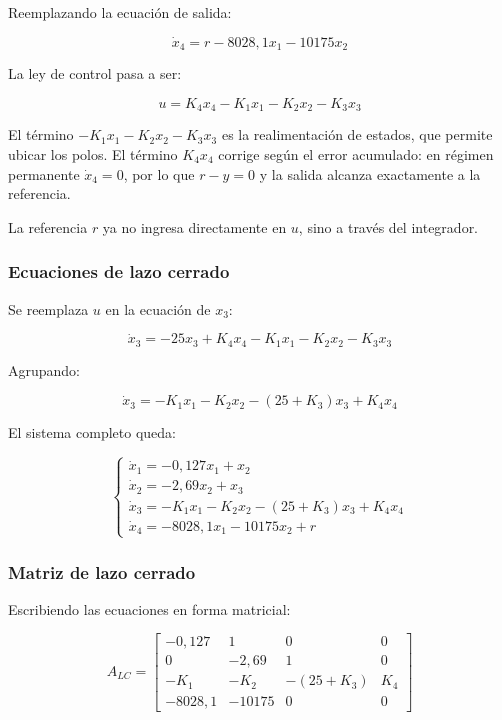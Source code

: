 \documentclass[12pt,a4paper]{article}
\begin{document}
Reemplazando la ecuación de salida:

\begin{equation}\boxed{\dot{x}_4=r-8028{,}1x_1-10175x_2}\end{equation}

La ley de control pasa a ser:

\begin{equation}\boxed{u=K_4x_4-K_1x_1-K_2x_2-K_3x_3}\end{equation}

El término $-K_1x_1-K_2x_2-K_3x_3$ es la realimentación de estados, que permite ubicar los polos. El término $K_4x_4$ corrige según el error acumulado: en régimen permanente $\dot{x}_4=0$, por lo que $r-y=0$ y la salida alcanza exactamente a la referencia.

La referencia $r$ ya no ingresa directamente en $u$, sino a través del integrador.
\subsubsection*{Ecuaciones de lazo cerrado}
Se reemplaza $u$ en la ecuación de $x_3$:

\begin{equation}\dot{x}_3=-25x_3+K_4x_4-K_1x_1-K_2x_2-K_3x_3\end{equation}

Agrupando:

\begin{equation}\dot{x}_3=-K_1x_1-K_2x_2-(25+K_3)x_3+K_4x_4\end{equation}

El sistema completo queda:

\begin{equation}\boxed{\begin{cases}\dot{x}_1=-0{,}127x_1+x_2\\\dot{x}_2=-2{,}69x_2+x_3\\\dot{x}_3=-K_1x_1-K_2x_2-(25+K_3)x_3+K_4x_4\\\dot{x}_4=-8028{,}1x_1-10175x_2+r\end{cases}}\end{equation}
\subsubsection*{Matriz de lazo cerrado}
Escribiendo las ecuaciones en forma matricial:

\begin{equation}\boxed{A_{LC}=\begin{bmatrix}-0{,}127&1&0&0\\0&-2{,}69&1&0\\-K_1&-K_2&-(25+K_3)&K_4\\-8028{,}1&-10175&0&0\end{bmatrix}}\end{equation}
\end{document}
